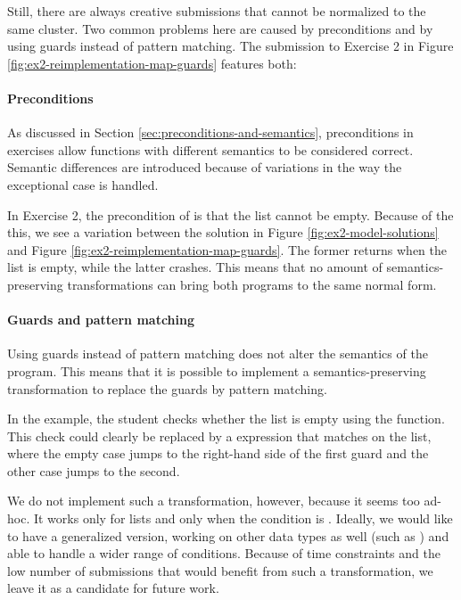 Still, there are always creative submissions that cannot be normalized to the same cluster. Two common problems here are caused by preconditions and by using guards instead of pattern matching. The submission to Exercise 2 in Figure \ref{fig:ex2-reimplementation-map-guards} features both:

\paragraph{Preconditions}

As discussed in Section \ref{sec:preconditions-and-semantics}, preconditions in exercises allow functions with different semantics to be considered correct. Semantic differences are introduced because of variations in the way the exceptional case is handled.

In Exercise 2, the precondition of  is that the list cannot be empty. Because of the this, we see a variation between the solution in Figure \ref{fig:ex2-model-solutions} and Figure \ref{fig:ex2-reimplementation-map-guards}. The former returns  when the list is empty, while the latter crashes. This means that no amount of semantics-preserving transformations can bring both programs to the same normal form.


\paragraph{Guards and pattern matching}

Using guards instead of pattern matching does not alter the semantics of the program. This means that it is possible to implement a semantics-preserving transformation to replace the guards by pattern matching.

In the example, the student checks whether the list is empty using the  function. This check could clearly be replaced by a  expression that matches on the list, where the empty case jumps to the right-hand side of the first guard and the other case jumps to the second.

We do not implement such a transformation, however, because it seems too ad-hoc. It works only for lists and only when the condition is . Ideally, we would like to have a generalized version, working on other data types as well (such as ) and able to handle a wider range of conditions. Because of time constraints and the low number of submissions that would benefit from such a transformation, we leave it as a candidate for future work.

